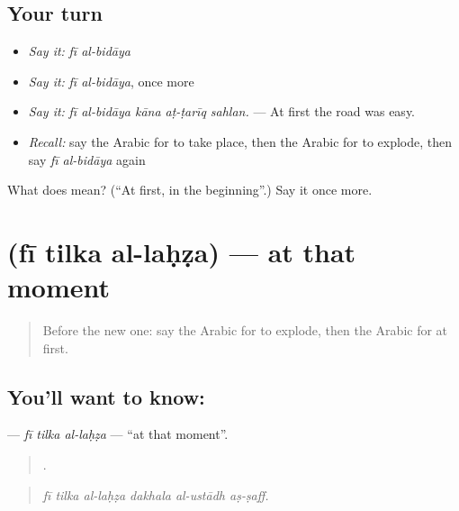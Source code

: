 \subsection*{Your turn}
\begin{itemize}
\raggedright
  \item \emph{Say it:} \emph{fī al-bidāya}
  \item \emph{Say it:} \emph{fī al-bidāya}, once more
  \item \emph{Say it:} \emph{fī al-bidāya kāna aṭ-ṭarīq sahlan.} — At first the road was easy.
  \item \emph{Recall:} say the Arabic for to take place, then the Arabic for to explode, then say \emph{fī al-bidāya} again
\end{itemize}

\begin{tcolorbox}[breakable,colback=teal!4,colframe=teal!35!black,title={Before you move on}]
What does   mean? (\textquotedblleft{}At first, in the beginning\textquotedblright{}.) Say it once more.
\end{tcolorbox}
\section[\texorpdfstring{\ar{في} \ar{تلك} \ar{اللحظة} (fī tilka al-laḥẓa)}{في تلك اللحظة (fī tilka al-laḥẓa)}]{   (fī tilka al-laḥẓa) — at that moment}

\label{lesson:AR-C294-fi-tilka-al-lahza}



\begin{quote}
Before the new one: say the Arabic for to explode, then the Arabic for at first.
\end{quote}

\subsection*{You'll want to know:   }
\textbf{  } — \emph{fī tilka al-laḥẓa} — \textquotedblleft{}at that moment\textquotedblright{}.

\begin{quote}
     .
\end{quote}

\begin{quote}
\emph{fī tilka al-laḥẓa dakhala al-ustādh aṣ-ṣaff.}
\end{quote}

